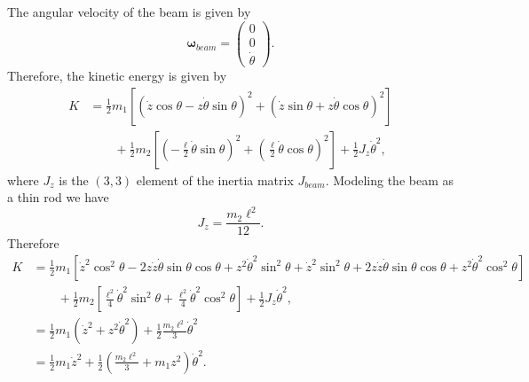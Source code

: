 The angular velocity of the beam is given by
\[
\boldsymbol{\omega}_{beam} = \begin{pmatrix} 0 \\ 0 \\ \dot{\theta} \end{pmatrix}.
\]
Therefore, the kinetic energy is given by
\begin{align*}
K &= \frac{1}{2}m_{1} \left[ (\dot{z}\cos\theta - z\dot{\theta}\sin\theta)^2 + (\dot{z}\sin\theta + z\dot{\theta}\cos\theta)^2 \right] 
\\ &\qquad
	+ \frac{1}{2}m_{2} \left[ (-\frac{\ell}{2}\dot{\theta}\sin\theta)^2 + (\frac{\ell}{2}\dot{\theta}\cos\theta)^2 \right]
	+ \frac{1}{2} J_z \dot{\theta}^2,
\end{align*}
where $J_z$ is the $(3,3)$ element of the inertia matrix $J_{beam}$.  Modeling the beam as a thin rod we have
\[
J_z = \frac{m_2\ell^2}{12}.
\]
Therefore
\begin{align*}
K &= \frac{1}{2}m_{1} \left[ \dot{z}^2\cos^2\theta - 2z\dot{z}\dot{\theta}\sin\theta\cos\theta + z^2\dot{\theta}^2\sin^2\theta + \dot{z}^2\sin^2\theta + 2z\dot{z}\dot{\theta}\sin\theta\cos\theta + z^2\dot{\theta}^2\cos^2\theta \right] 
\\ &\qquad
	+ \frac{1}{2}m_{2} \left[ \frac{\ell^2}{4}\dot{\theta}^2\sin^2\theta + \frac{\ell^2}{4}\dot{\theta}^2\cos^2\theta \right]
	+ \frac{1}{2} J_z \dot{\theta}^2, \\
	&= \frac{1}{2}m_{1} \left( \dot{z}^2 + z^2\dot{\theta}^2 \right) 
	+ \frac{1}{2} \frac{m_{2}\ell^2}{3} \dot{\theta}^2 \\
	&= \frac{1}{2}m_{1} \dot{z}^2 + \frac{1}{2} \left(\frac{m_{2}\ell^2}{3} + m_1 z^2\right) \dot{\theta}^2.
\end{align*}






